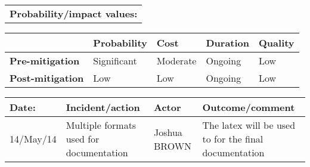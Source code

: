 \begin{table}
\begin{tabularx}{\textwidth}{| X |}
		\hline
		\textbf{Probability/impact values:} \\
	\end{tabularx}
	\begin{tabularx}{\textwidth}{| l | l | X | X | X |}
		\hline
		 &  \textbf{Probability} & \textbf{Cost} & \textbf{Duration} & \textbf{Quality} \\ \hline
		\textbf{Pre-mitigation} & Significant & Moderate & Ongoing & Low \\ \hline
		\textbf{Post-mitigation} & Low & Low & Ongoing & Low \\ \hline \hline
	\end{tabularx}
	\begin{tabularx}{\textwidth}{| l | X | l | X |}
		\hline
		\textbf{Date:} & \textbf{Incident/action} & \textbf{Actor} & \textbf{Outcome/comment} \\ \hline
		14/May/14 & Multiple formats used for documentation  & Joshua BROWN  & The latex will be used to for the final documentation  \\ \hline
	\end{tabularx}%
\end{table}

